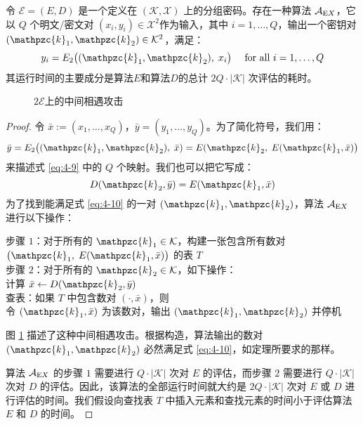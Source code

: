 \begin{theorem}\label{theo:4-2}
令 $\mathcal{E}=(E,D)$ 是一个定义在 $(\mathcal{K},\mathcal{X})$ 上的分组密码。存在一种算法 $\mathcal{A}_{{\rm E}X}$，它以 $Q$ 个明文/密文对 $(x_i,y_i)\in\mathcal{X}^2$作为输入，其中 $i=1,\dots,Q$，输出一个密钥对 $(\mathpzc{k}_1,\mathpzc{k}_2)\in\mathcal{K}^2$，满足：
\begin{equation}\label{eq:4-9}
y_i=E_2\big((\mathpzc{k}_1,\mathpzc{k}_2),\;x_i\big)
\quad\text{ for all }
i=1,\dots,Q
\end{equation}
其运行时间的主要成分是算法$E$和算法$D$的总计 $2Q\cdot|\mathcal{K}|$ 次评估的耗时。
\end{theorem}

\begin{figure}
  \centering
  
  \caption{$2\mathcal{E}$上的中间相遇攻击}
  \label{fig:4-10}
\end{figure}

\begin{proof}
令 $\bar{x}:=(x_1,\dots,x_Q)$，$\bar{y}=(y_1,\dots,y_Q)$。为了简化符号，我们用：
\[
\bar y=E_2\big((\mathpzc{k}_1,\mathpzc{k}_2),\;\bar x)=E(\mathpzc{k}_2,\;E(\mathpzc{k}_1,\bar x)\big)
\]
来描述式 \ref{eq:4-9} 中的 $Q$ 个映射。我们也可以把它写成：
\begin{equation}\label{eq:4-10}
D(\mathpzc{k}_2,\bar y)=E(\mathpzc{k}_1,\bar x)
\end{equation}
为了找到能满足式 \ref{eq:4-10} 的一对 $(\mathpzc{k}_1,\mathpzc{k}_2)$，算法 $\mathcal{A}_{{\rm E}X}$ 进行以下操作：

\vspace*{5pt}

\hspace*{5pt} 步骤 $1$：对于所有的 $\mathpzc{k}_1\in\mathcal{K}$，构建一张包含所有数对 $\big(\mathpzc{k}_1,\;E(\mathpzc{k}_1,\bar x)\big)$ 的表 $T$\\
\hspace*{26pt} 步骤 $2$：对于所有的 $\mathpzc{k}_2\in\mathcal{K}$，如下操作：\\
\hspace*{80pt} 计算 $\bar x\leftarrow D(\mathpzc{k}_2,\bar y)$\\
\hspace*{80pt} 查表：如果 $T$ 中包含数对 $(\cdot,\bar x)$，则\\
\hspace*{112pt} 令 $(\mathpzc{k}_1,\bar x)$ 为该数对，输出 $(\mathpzc{k}_1,\mathpzc{k}_2)$ 并停机

\vspace*{5pt}

\noindent
图 \ref{fig:4-10} 描述了这种中间相遇攻击。根据构造，算法输出的数对 $(\mathpzc{k}_1,\mathpzc{k}_2)$ 必然满足式 \ref{eq:4-10}，如定理所要求的那样。

算法 $\mathcal{A}_{{\rm E}X}$ 的步骤 $1$ 需要进行 $Q\cdot|\mathcal{K}|$ 次对 $E$ 的评估，而步骤 $2$ 需要进行 $Q\cdot|\mathcal{K}|$ 次对 $D$ 的评估。因此，该算法的全部运行时间就大约是 $2Q\cdot|\mathcal{K}|$ 次对 $E$ 或 $D$ 进行评估的时间。我们假设向查找表 $T$ 中插入元素和查找元素的时间小于评估算法 $E$ 和 $D$ 的时间。
\end{proof}

